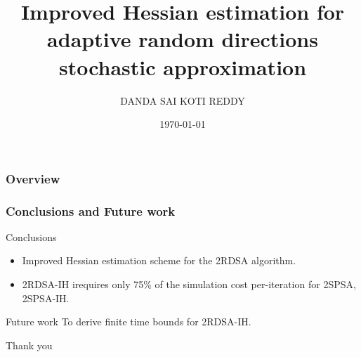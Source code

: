 \documentclass{beamer}
\title[Stochastic optimization]{Improved Hessian estimation for adaptive random directions stochastic approximation} %
\author{ DANDA SAI KOTI REDDY } %
\institute[IISC] %
{
%
%
}
\date{\today} %
\begin{document}
\begin{frame}
\titlepage 
\end{frame}

\begin{frame}
\frametitle{Overview}
\tableofcontents
\end{frame}



%



\begin{frame}
\frametitle{\centering  Conclusions and Future work}
\begin{block}{Conclusions}
\begin{itemize}
\item Improved Hessian estimation scheme for the 2RDSA algorithm.
\item  2RDSA-IH irequires only 75\% of the simulation cost per-iteration for 2SPSA, 2SPSA-IH.
\end{itemize}
\end{block}
\begin{block}{Future work}
To derive finite time bounds for 2RDSA-IH.
\end{block}

\end{frame}



%
%


\begin{frame}

\begin{block}{}
\begin{center}
{\Huge Thank you}
\end{center}
\end{block}
\end{frame}
\end{document}
